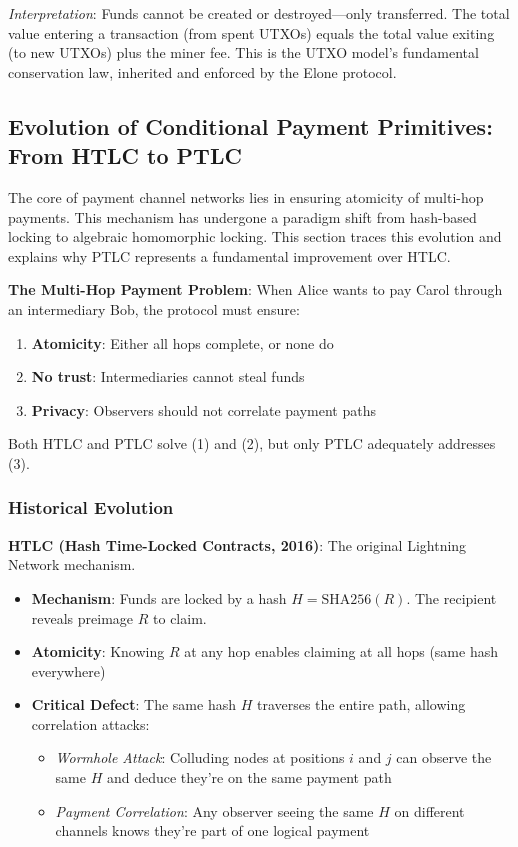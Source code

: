 \textit{Interpretation}: Funds cannot be created or destroyed---only transferred. The total value entering a transaction (from spent UTXOs) equals the total value exiting (to new UTXOs) plus the miner fee. This is the UTXO model's fundamental conservation law, inherited and enforced by the Elone protocol.

\subsection{Evolution of Conditional Payment Primitives: From HTLC to PTLC}

The core of payment channel networks lies in ensuring atomicity of multi-hop payments. This mechanism has undergone a paradigm shift from hash-based locking to algebraic homomorphic locking. This section traces this evolution and explains why PTLC represents a fundamental improvement over HTLC.

\textbf{The Multi-Hop Payment Problem}:
When Alice wants to pay Carol through an intermediary Bob, the protocol must ensure:
\begin{enumerate}
    \item \textbf{Atomicity}: Either all hops complete, or none do
    \item \textbf{No trust}: Intermediaries cannot steal funds
    \item \textbf{Privacy}: Observers should not correlate payment paths
\end{enumerate}

Both HTLC and PTLC solve (1) and (2), but only PTLC adequately addresses (3).

\subsubsection{Historical Evolution}

\textbf{HTLC (Hash Time-Locked Contracts, 2016)}: The original Lightning Network mechanism.
\begin{itemize}
    \item \textbf{Mechanism}: Funds are locked by a hash $H = \text{SHA256}(R)$. The recipient reveals preimage $R$ to claim.
    \item \textbf{Atomicity}: Knowing $R$ at any hop enables claiming at all hops (same hash everywhere)
    \item \textbf{Critical Defect}: The same hash $H$ traverses the entire path, allowing correlation attacks:
    \begin{itemize}
        \item \textit{Wormhole Attack}: Colluding nodes at positions $i$ and $j$ can observe the same $H$ and deduce they're on the same payment path
        \item \textit{Payment Correlation}: Any observer seeing the same $H$ on different channels knows they're part of one logical payment
    \end{itemize}
\end{itemize}

